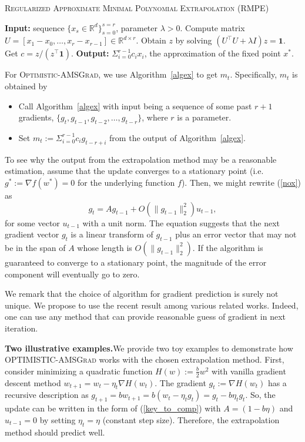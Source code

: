 \documentclass[11pt]{article}
\theoremstyle{k}
\begin{document}
\begin{algorithm}[h]
\begin{algorithmic}[1] 
\small
\caption{\textsc{Regularized Approximate Minimal Polynomial Extrapolation} (RMPE)
\cite{SAB16} } \label{algex}
\STATE \textbf{Input:} sequence $\{ x_s \in \mathbb R^d \}_{s=0}^{s=r}$, parameter $\lambda > 0$.
\STATE Compute matrix  $U = [ x_1 - x_0, \dots, x_{r} - x_{r-1}] \in \mathbb R^{d \times r}$.
\STATE Obtain $z$ by solving $(U^\top U + \lambda I ) z = \mathbf{1}$.
\STATE Get $c= z / (z^\top \mathbf{1})$.
\STATE \textbf{Output:} $\Sigma_{i=0}^{r-1} c_i x_i$, the approximation of the fixed point $x^*$.
\end{algorithmic}
\end{algorithm}


For \textsc{Optimistic-AMSGrad},
we use Algorithm~\ref{algex} to get $m_t$.
Specifically, $m_t$ is obtained by
\begin{itemize}
\item Call Algorithm~\ref{algex} with input being a sequence of some past $r+1$ gradients, $\{ g_t, g_{t-1},g_{t-2}, \dots, g_{t-r} \}$, %
where $r$ is a parameter.
\item Set $m_t:= \Sigma_{i=0}^{r-1} c_i g_{t-r+i}$ from the output of Algorithm~\ref{algex}.
\end{itemize}


To see why the output from the extrapolation method may be a reasonable estimation, assume that the update converges to
a stationary point (i.e. $g^*:=\nabla f(w^*) = 0$ for the underlying function $f$).
Then, we might rewrite (\ref{nox}) as
\begin{equation} \label{key_to_comp}
g_t = A g_{t-1}  + O( \| g_{t-1} \|_2^2 ) u_{t-1},
\end{equation}
for some vector $u_{t-1}$ with a unit norm.
The equation suggests that the next gradient vector $g_{t}$ is a linear transform of $g_{{t-1}}$
plus an error vector that may not be in the span of $A$ whose length is $O( \| g_{t-1} \|_2^2 )$.
If the algorithm is guaranteed to converge to a stationary point, the magnitude of the error component will eventually go to zero.

We remark that the choice of algorithm for gradient prediction is surely not unique. We propose to use the recent result among various related works. Indeed, one can use any method that can provide reasonable guess of gradient in next iteration.

\noindent
\textbf{Two illustrative examples.}\hspace{0.1in}We provide two toy examples to demonstrate how \textsc{OPTIMISTIC-AMSGrad} works with the chosen extrapolation method. First, consider minimizing a quadratic function $H(w) := \frac{b}{2} w^2 $  
with vanilla gradient descent method $w_{t+1} = w_t - \eta_t \nabla H(w_t)$. 
The gradient $g_{t}:= \nabla H(w_{t})$ has a recursive description as 
$g_{t+1} = b w_{t+1} = b ( w_t  - \eta_t g_t ) = g_t - b \eta_t g_t  $.
So, the update can be written in the form of (\ref{key_to_comp}) 
with $A = (1 - b \eta)$ and $u_{t-1}=0$ by setting $\eta_t=\eta$ (constant step size).
Therefore, the extrapolation method should predict well.
\end{document}
